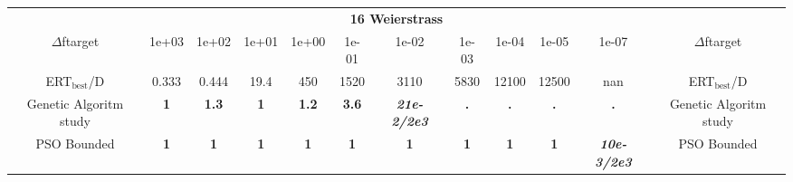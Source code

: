 \begin{tabular}{cccccccccccc}
 & \multicolumn{10}{c}{{\normalsize \textbf{16 Weierstrass}}}\\
$\Delta$ftarget& 1e+03& 1e+02& 1e+01& 1e+00& 1e-01& 1e-02& 1e-03& 1e-04& 1e-05& 1e-07 & $\Delta$ftarget \\
ERT$_{\textrm{best}}$/D& 0.333& 0.444& 19.4& 450& 1520& 3110& 5830& 12100& 12500& nan & ERT$_{\textrm{best}}$/D \\
\hline
Genetic Algoritm study & \textbf{1} & \textbf{1.3} & \textbf{1} & \textbf{1.2} & \textbf{3.6} & \textbf{\textit{21e-2}\textit{/2e3}} & \textbf{.} & \textbf{.} & \textbf{.} & \textbf{.} & Genetic Algoritm study \cite{add_an_entry_for_Genetic Algoritm study_in_bbob.bib}\\
PSO Bounded & \textbf{1} & \textbf{1} & \textbf{1} & \textbf{1} & \textbf{1} & \textbf{1} & \textbf{1} & \textbf{1} & \textbf{1} & \textbf{\textit{10e-3}\textit{/2e3}} & PSO Bounded \cite{add_an_entry_for_PSO Bounded_in_bbob.bib}
\end{tabular}
